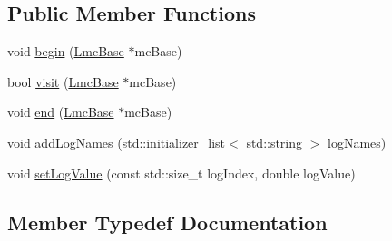 \subsection*{Public Member Functions}
\begin{DoxyCompactItemize}
\item 
void \hyperlink{classnifty_1_1graph_1_1optimization_1_1lifted__multicut_1_1PyLiftedMulticutVisitorBase_a53f05fefd6f6e13a333d740672b1c2e3}{begin} (\hyperlink{classnifty_1_1graph_1_1optimization_1_1lifted__multicut_1_1PyLiftedMulticutVisitorBase_a18c026203096e615e751d9a320074443}{Lmc\+Base} $\ast$mc\+Base)
\item 
bool \hyperlink{classnifty_1_1graph_1_1optimization_1_1lifted__multicut_1_1PyLiftedMulticutVisitorBase_a8c0df72ed69a537ee92f8cdf6f0abb22}{visit} (\hyperlink{classnifty_1_1graph_1_1optimization_1_1lifted__multicut_1_1PyLiftedMulticutVisitorBase_a18c026203096e615e751d9a320074443}{Lmc\+Base} $\ast$mc\+Base)
\item 
void \hyperlink{classnifty_1_1graph_1_1optimization_1_1lifted__multicut_1_1PyLiftedMulticutVisitorBase_a75b8698992339d71ba523562abd8d8c5}{end} (\hyperlink{classnifty_1_1graph_1_1optimization_1_1lifted__multicut_1_1PyLiftedMulticutVisitorBase_a18c026203096e615e751d9a320074443}{Lmc\+Base} $\ast$mc\+Base)
\item 
void \hyperlink{classnifty_1_1graph_1_1optimization_1_1lifted__multicut_1_1PyLiftedMulticutVisitorBase_a4eca50c278dd46b7065aeecbdb345613}{add\+Log\+Names} (std\+::initializer\+\_\+list$<$ std\+::string $>$ log\+Names)
\item 
void \hyperlink{classnifty_1_1graph_1_1optimization_1_1lifted__multicut_1_1PyLiftedMulticutVisitorBase_a48962511731dbaf8d36f5aab5a2b6dea}{set\+Log\+Value} (const std\+::size\+\_\+t log\+Index, double log\+Value)
\end{DoxyCompactItemize}


\subsection{Member Typedef Documentation}
\hypertarget{classnifty_1_1graph_1_1optimization_1_1lifted__multicut_1_1PyLiftedMulticutVisitorBase_a5640dc1803af4f3a7724d0fd80b357b2}{}
